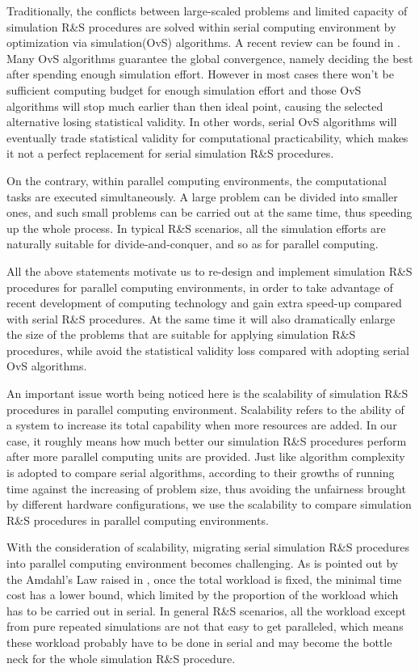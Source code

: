 Traditionally, the conflicts between large-scaled problems and limited capacity of simulation R\&S procedures are solved within serial computing environment by optimization via simulation(OvS) algorithms. A recent review can be found in \cite{potwsc09ovs}. Many OvS algorithms guarantee the global convergence, namely deciding the best after spending enough simulation effort. However in most cases there won't be sufficient computing budget for enough simulation effort and those OvS algorithms will stop much earlier than then ideal point, causing the selected alternative losing statistical validity. In other words, serial OvS algorithms will eventually trade statistical validity for computational practicability, which makes it not a perfect replacement for serial simulation R\&S procedures.

On the contrary, within parallel computing environments, the computational tasks are executed simultaneously. A large problem can be divided into smaller ones, and such small problems can be carried out at the same time, thus speeding up the whole process. In typical R\&S scenarios, all the simulation efforts are naturally suitable for divide-and-conquer, and so as for parallel computing.

All the above statements motivate us to re-design and implement simulation R\&S procedures for parallel computing environments, in order to take advantage of recent development of computing technology and gain extra speed-up compared with serial R\&S procedures. At the same time it will also dramatically enlarge the size of the problems that are suitable for applying simulation R\&S procedures, while avoid the statistical validity loss compared with adopting serial OvS algorithms.

An important issue worth being noticed here is the scalability of simulation R\&S procedures in parallel computing environment. Scalability refers to the ability of a system to increase its total capability when more resources are added. In our case, it roughly means how much better our simulation R\&S procedures perform after more parallel computing units are provided. Just like algorithm complexity is adopted to compare serial algorithms, according to their growths of running time against the increasing of problem size, thus avoiding the unfairness brought by different hardware configurations, we use the scalability to compare simulation R\&S procedures in parallel computing environments.

With the consideration of scalability, migrating serial simulation R\&S procedures into parallel computing environment becomes challenging. As is pointed out by the Amdahl's Law raised in \cite{amdahl}, once the total workload is fixed, the minimal time cost has a lower bound, which limited by the proportion of the workload which has to be carried out in serial. In general R\&S scenarios, all the workload except from pure repeated simulations are not that easy to get paralleled, which means these workload probably have to be done in serial and may become the bottle neck for the whole simulation R\&S procedure.

